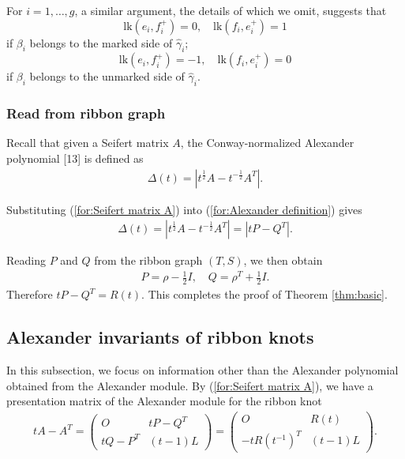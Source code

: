 \documentclass{amsart}
\theoremstyle{definition}
\theoremstyle{remark}
\numberwithin{equation}{subsection}
\begin{document}
For $i = 1, \dots, g$, a similar argument, the details of which we omit, suggests that
\[
\text{lk}(e_i, f_i^+) = 0, \quad \text{lk}(f_i, e_i^+) = 1
\]
if $\beta_i$ belongs to the marked side of $\hat{\gamma}_i$;
\[
\text{lk}(e_i, f_i^+) = -1, \quad \text{lk}(f_i, e_i^+) = 0
\]
if $\beta_i$ belongs to the unmarked side of $\hat{\gamma}_i$.

\subsubsection{Read from ribbon graph}

Recall that given a Seifert matrix $A$, the Conway-normalized Alexander polynomial [13] is defined as
\begin{align}
    \Delta(t) = |t^{\frac{1}{2}}A - t^{-\frac{1}{2}}A^T|. \label{for:Alexander definition}
\end{align}

Substituting (\ref{for:Seifert matrix A}) into (\ref{for:Alexander definition}) gives
\begin{align}
    \Delta(t) = |t^{\frac{1}{2}}A - t^{-\frac{1}{2}}A^T| = |tP - Q^T|.
\end{align}

Reading $P$ and $Q$ from the ribbon graph $(T, S)$, we then obtain
\begin{align}
    P = \rho - \frac{1}{2}I, \quad Q = \rho^T + \frac{1}{2}I.
\end{align}
Therefore $tP - Q^T = R(t)$. This completes the proof of Theorem \ref{thm:basic}.

\subsection{Alexander invariants of ribbon knots}

In this subsection, we focus on information other than the Alexander polynomial obtained from the Alexander module. By (\ref{for:Seifert matrix A}), we have a presentation matrix of the Alexander module for the ribbon knot
\begin{align}
   tA - A^T = 
\begin{pmatrix}
O & tP - Q^T \\
tQ - P^T & (t - 1)L
\end{pmatrix} = 
\begin{pmatrix}
O & R(t) \\
-tR(t^{-1})^T & (t - 1)L
\end{pmatrix}. \label{for:tAAT}   
\end{align}
\end{document}
